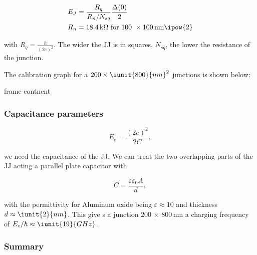 \begin{framed}\noindent
  \begin{equation}\label{eq:fabrication_jj_2}
    \begin{aligned}
      E_J & = \frac{R_q}{R_n/N_{sq}}\frac{\Delta(0)}{2}\\
      R_n &= 18.4\,\text{k}\Omega \text{ for 100 } \times 100\,\text{nm}\ipow{2}
    \end{aligned}
  \end{equation}
  
  \noindent with $ R_q = \frac{h}{(2e)^2} $.  The wider  the JJ is in squares, $ N_{sq} $, the
  lower the resistance of the junction.
  
  The calibration graph for a $ 200 \times \iunit{800}{nm}^2 $ junctions is shown below:

	
  \ec frame-contnent
\end{framed}


\subsubsection{Capacitance parameters}
\label{sec:capac-param}

\begin{equation}\label{eqn:sim_1}
  E_c = \frac{(2e)^2}{2C},
\end{equation}
 
\noindent we need the capacitance of the JJ. We  can treat the two overlapping parts of the JJ
acting a parallel plate capacitor with

\begin{framed}\noindent
  \begin{equation}\label{key}
    C = \frac{\varepsilon\varepsilon_0A}{d},
  \end{equation}
 
  \noindent with  the permittivity  for Aluminum oxide  being $ \varepsilon  \approx 10  $ and
  thickness  $  d  \approx  \iunit{2}{nm}  $.   This   give  s  a  junction  200  $  \times  $
  800\,nm a charging frequency of $ E_c/\hbar \approx\iunit{19}{GHz} $.
\end{framed}

\subsubsection{Summary}
\label{sec:summary}

